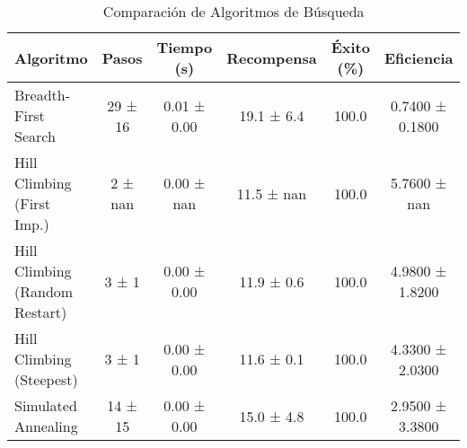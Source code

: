 \begin{table}[H]
\centering
\caption{Comparación de Algoritmos de Búsqueda}
\label{tab:search_comparison}
\begin{tabular}{|l|c|c|c|c|c|}
\hline
\textbf{Algoritmo} & \textbf{Pasos} & \textbf{Tiempo (s)} & \textbf{Recompensa} & \textbf{Éxito (\%)} & \textbf{Eficiencia} \\
\hline
Breadth-First Search & 29 ± 16 & 0.01 ± 0.00 & 19.1 ± 6.4 & 100.0 & 0.7400 ± 0.1800 \\
\hline
Hill Climbing (First Imp.) & 2 ± nan & 0.00 ± nan & 11.5 ± nan & 100.0 & 5.7600 ± nan \\
\hline
Hill Climbing (Random Restart) & 3 ± 1 & 0.00 ± 0.00 & 11.9 ± 0.6 & 100.0 & 4.9800 ± 1.8200 \\
\hline
Hill Climbing (Steepest) & 3 ± 1 & 0.00 ± 0.00 & 11.6 ± 0.1 & 100.0 & 4.3300 ± 2.0300 \\
\hline
Simulated Annealing & 14 ± 15 & 0.00 ± 0.00 & 15.0 ± 4.8 & 100.0 & 2.9500 ± 3.3800 \\
\hline
\end{tabular}
\end{table}